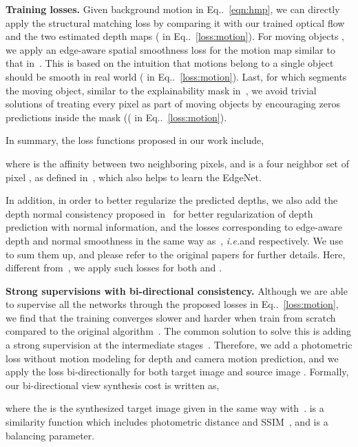 \documentclass[runningheads]{llncs}
\makeatletter
\newcommand{\equref}[1]{Eq\onedot~\eqref{#1}}
\DeclareRobustCommand\onedot{\futurelet\@let@token\@onedot}
\def\onedot{\ifx\@let@token.\else.\null\fi\xspace}
\def\ie{\emph{i.e.}}
\makeatother
\begin{document}
\noindent\textbf{Training losses.} 
Given background motion  in \equref{eqn:hmp}, we can directly apply the structural matching loss by comparing it with our trained optical flow  and the two estimated depth maps  ( in \equref{loss:motion}). 
For moving objects , we apply an edge-aware spatial smoothness loss for the motion map similar to that in~\cite{yang2018cvpr}. This is based on the intuition that motions belong to a single object should be smooth in real world ( in \equref{loss:motion}).
Last, for  which segments the moving object, similar to the explainability mask in~\cite{zhou2017unsupervised}, we avoid trivial solutions of treating every pixel as part of moving objects by encouraging zeros predictions inside the mask (( in \equref{loss:motion}).

In summary, the loss functions proposed in our work include,



where  is the affinity between two neighboring pixels, and  is a four neighbor set of pixel , as defined in~\cite{yang2018cvpr}, which also helps to learn the EdgeNet.

In addition, in order to better regularize the predicted depths, we also add the depth normal consistency proposed in~\cite{yang2018aaai} for better regularization of depth prediction with normal information, and the losses corresponding to edge-aware depth and normal smoothness in the same way as~\cite{yang2018cvpr}, \ie  and  respectively. We use  to sum them up, and please refer to the original papers for further details. Here, different from~\cite{yang2018cvpr}, we apply such losses for both  and .

\noindent\textbf{Strong supervisions with bi-directional consistency.} Although we are able to supervise all the networks through the proposed losses in \equref{loss:motion}, we find that the training converges slower and harder when train from scratch compared to the original algorithm~\cite{yang2018cvpr}. The common solution to solve this is adding a strong supervision at the intermediate stages~\cite{simonyan2014very,lee2015deeply}. 
Therefore, we add a photometric loss without motion modeling for depth and camera motion prediction, and we apply the loss bi-directionally for both target image  and source image . Formally, our bi-directional view synthesis cost is written as,

where the  is the synthesized target image given  in the same way with~\cite{zhou2017unsupervised}.  is a similarity function which includes photometric distance and SSIM~\cite{wang2004image}, and  is a balancing parameter.
\end{document}
